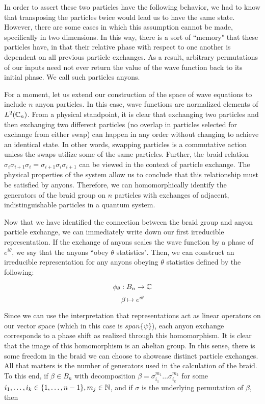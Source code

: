 In order to assert these two particles have the following behavior, we had to know that transposing the particles twice would lead us to have the same state. However, there are some cases in which this assumption cannot be made, specifically in two dimensions. In this way, there is a sort of ``memory" that these particles have, in that their relative phase with respect to one another is dependent on all previous particle exchanges. As a result, arbitrary permutations of our inputs need not ever return the value of the wave function back to its initial phase. We call such particles anyons.

For a moment, let us extend our construction of the space of wave equations to include $n$ anyon particles. In this case, wave functions are normalized elements of $L^2(\mathbb{C}_n)$. From a physical standpoint, it is clear that exchanging two particles and then exchanging two different particles (no overlap in particles selected for exchange from either swap) can happen in any order without changing to achieve an identical state. In other words, swapping particles is a commutative action unless the swaps utilize some of the same particles. Further, the braid relation $\sigma_i\sigma_{i+1}\sigma_i =\sigma_{i+1}\sigma_i\sigma_{i+1}$ can be viewed in the context of particle exchange. The physical properties of the system allow us to conclude that this relationship must be satisfied by anyons. Therefore, we can homomorphically identify the generators of the braid group on $n$ particles with exchanges of adjacent, indistinguishable particles in a quantum system.

Now that we have identified the connection between the braid group and anyon particle exchange, we can immediately write down our first irreducible representation. If the exchange of anyons scales the wave function by a phase of $e^{i\theta}$, we say that the anyons ``obey $\theta$ statistics". Then, we can construct an irreducible representation for any anyons obeying $\theta$ statistics defined by the following:

$$\phi_\theta:B_n\rightarrow \mathbb{C}$$
$$\beta\mapsto e^{i\theta}$$

Since we can use the interpretation that representations act as linear operators on our vector space (which in this case is $span\{\psi\}$), each anyon exchange corresponds to a phase shift as realized through this homomorphism. It is clear that the image of this homomorphism is an abelian group. In this sense, there is some freedom in the braid we can choose to showcase distinct particle exchanges. All that matters is the number of generators used in the calculation of the braid. To this end, if $\beta\in B_n$ with decomposition $\beta = \sigma^{m_1}_{i_1}\hdots\sigma^{m_k}_{i_k}$ for some $i_1,\hdots,i_k\in\{1,\hdots,n-1\},m_j\in\mathbb{N}$, and if $\sigma$ is the underlying permutation of $\beta$, then


